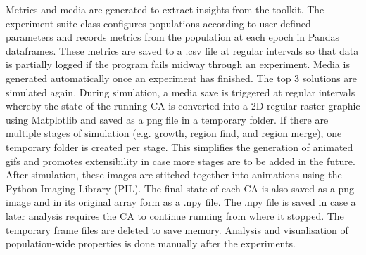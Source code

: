 Metrics and media are generated to extract insights from the toolkit. The experiment suite class configures populations according to user-defined parameters and records metrics from the population at each epoch in Pandas dataframes. These metrics are saved to a .csv file at regular intervals so that data is partially logged if the program fails midway through an experiment. Media is generated automatically once an experiment has finished. The top 3 solutions are simulated again. During simulation, a media save is triggered at regular intervals whereby the state of the running CA is converted into a 2D regular raster graphic using Matplotlib and saved as a png file in a temporary folder. If there are multiple stages of simulation (e.g. growth, region find, and region merge), one temporary folder is created per stage. This simplifies the generation of animated gifs and promotes extensibility in case more stages are to be added in the future. After simulation, these images are stitched together into animations using the Python Imaging Library (PIL). The final state of each CA is also saved as a png image and in its original array form as a .npy file. The .npy file is saved in case a later analysis requires the CA to continue running from where it stopped. The temporary frame files are deleted to save memory. Analysis and visualisation of population-wide properties is done manually after the experiments.
